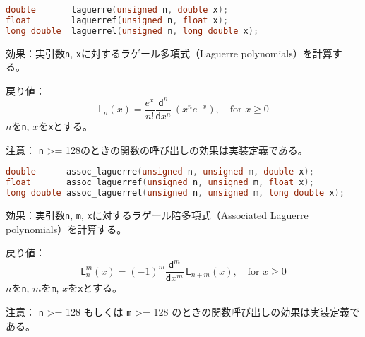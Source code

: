 %

\bgroup
\begin{lstlisting}[language=C++, aboveskip=0.0zw]
double       laguerre(unsigned n, double x);
float        laguerref(unsigned n, float x);
long double  laguerrel(unsigned n, long double x);
\end{lstlisting}
\egroup

\noindent
\textsf{効果}：実引数\lstinline!n!,
\lstinline!x!に対するラゲール多項式（Laguerre polynomials）を計算する。

\noindent
\textsf{戻り値}：
\[
  \mathsf{L}_n(x) =
  \frac{e^x}{n!} \frac{ \mathsf{d} ^ n}
            { \mathsf{d}x ^ n} \, (x^n e^{-x}),
       \quad \mbox{for $x \ge 0$}
\]
\hspace*{3em}\(n\)を\lstinline!n!, \(x\)を\lstinline!x!とする。

\noindent
\textsf{注意}： \lstinline!n! \textgreater{}=
128のときの関数の呼び出しの効果は実装定義である。

%

\bgroup
\begin{lstlisting}[language=C++, aboveskip=0.0zw]
double      assoc_laguerre(unsigned n, unsigned m, double x);
float       assoc_laguerref(unsigned n, unsigned m, float x);
long double assoc_laguerrel(unsigned n, unsigned m, long double x);
\end{lstlisting}
\egroup

\noindent
\textsf{効果}：実引数\lstinline!n!, \lstinline!m!,
\lstinline!x!に対するラゲール陪多項式（Associated Laguerre
polynomials）を計算する。

\noindent
\textsf{戻り値}：
\[
  \mathsf{L}_n^m(x) =
  (-1)^m \frac{\mathsf{d} ^ m}
       {\mathsf{d}x ^ m} \, \mathsf{L}_{n+m}(x),
       \quad \mbox{for $x \ge 0$}
\]
\hspace*{3em}\(n\)を\lstinline!n!, \(m\)を\lstinline!m!, \(x\)を\lstinline!x!とする。

\noindent
\textsf{注意}： \lstinline!n! \textgreater{}= 128 もしくは \lstinline!m!
\textgreater{}= 128 のときの関数呼び出しの効果は実装定義である。

%

